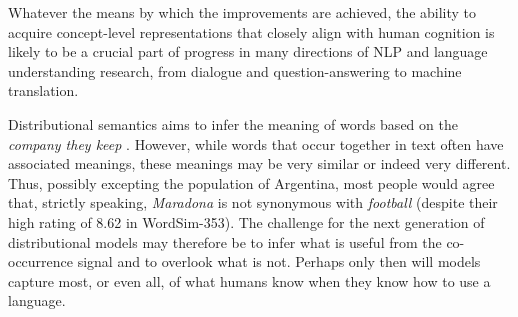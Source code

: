 Whatever the means by which the improvements are achieved, the ability to acquire concept-level representations that closely align with human cognition is likely to be a crucial part of progress in many directions of NLP and language understanding research, from dialogue and question-answering to machine translation. 

Distributional semantics aims to infer the meaning of words based on the \emph{company they keep} \citep{dist}. However, while words that occur together in text often have associated meanings, these meanings may be very similar or indeed very different. Thus, possibly excepting the population of Argentina, most people would agree that, strictly speaking, \emph{Maradona} is not synonymous with \emph{football} (despite their high rating of 8.62 in WordSim-353). The challenge for the next generation of distributional models may therefore be to infer what is useful from the co-occurrence signal and to overlook what is not. Perhaps only then will models capture most, or even all, of what humans know when they know how to use a language. 
